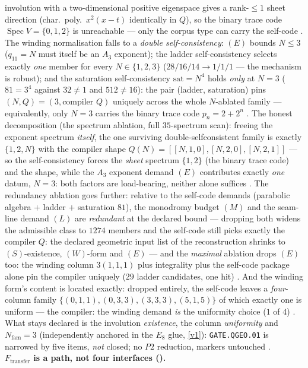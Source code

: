 \documentclass[11pt,a4paper]{article}
\newcommand{\Nfam}{N_{\mathrm{fam}}}
\theoremstyle{definition}
\begin{document}
\begin{winbox}
involution with a two-dimensional positive eigenspace gives a rank-$\le1$ sheet direction
(char.\ poly.\ $x^2(x-t)$ identically in $Q$), so the binary trace code
$\operatorname{Spec}V=\{0,1,2\}$ is unreachable --- only the corpus type can carry the self-code
\mE.  The winding normalisation falls to a \emph{double self-consistency}: $(E)$ bounds
$N\le3$ ($q_{11}=N$ must itself be an $A_3$ exponent); the ladder self-consistency selects
exactly \emph{one} member for every $N\in\{1,2,3\}$ ($28/16/14\to1/1/1$ --- the mechanism is
robust); and the saturation self-consistency $\mathrm{sat}=N^4$ holds \emph{only} at $N=3$
($81=3^4$ against $32\neq1$ and $512\neq16$): the pair (ladder, saturation) pins
$(N,Q)=(3,\text{compiler }Q)$ uniquely across the whole $N$-ablated family --- equivalently,
only $N=3$ carries the binary trace code $p_n=2+2^n$ \mE.  The honest decomposition (the
spectrum ablation, full $35$-spectrum scan): freeing the exponent spectrum \emph{itself}, the
one surviving double-selfconsistent family is exactly $\{1,2,N\}$ with the compiler shape
$Q(N)=[[N,1,0],[N,2,0],[N,2,1]]$ --- so the self-consistency forces the \emph{sheet} spectrum
$\{1,2\}$ (the binary trace code) and the shape, while the $A_3$ exponent demand $(E)$
contributes exactly \emph{one} datum, $N=3$: both factors are load-bearing, neither alone
suffices \mE.  The redundancy ablation goes further: relative to the self-code demands
(parabolic algebra $+$ ladder $+$ saturation $81$), the monodromy budget $(M)$ and the
seam-line demand $(L)$ are \emph{redundant} at the declared bound --- dropping both widens the
admissible class to $1274$ members and the self-code still picks exactly the compiler $Q$: the
declared geometric input list of the reconstruction shrinks to $(S)$-existence, $(W)$-form and
$(E)$ --- and the \emph{maximal} ablation drops $(E)$ too: the winding column $3(1,1,1)$ plus
integrality plus the self-code package alone pin the compiler uniquely ($29$ ladder candidates,
one hit) \mE.  And the winding form's content is located exactly: dropped entirely, the
self-code leaves a \emph{four}-column family $\{(0,1,1),(0,3,3),(3,3,3),(5,1,5)\}$ of which
exactly one is uniform --- the compiler: the winding demand \emph{is} the uniformity choice
($1$ of $4$) \mE.  What stays declared is the involution \emph{existence}, the column
\emph{uniformity} and $\Nfam=3$ (independently anchored in the $E_8$ glue, \vref{v1}):
\texttt{GATE.QGEO.01} is narrowed by five items, \emph{not} closed; no $P2$ reduction,
markers untouched \mC.
\smallskip\\
\noindent\textbf{$F_{\mathrm{transfer}}$ is a path, not four interfaces ().}

\end{winbox}
\end{document}
